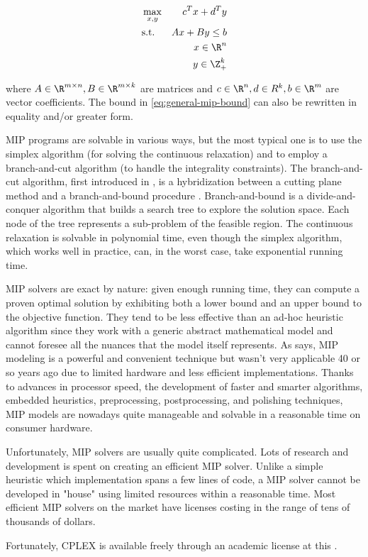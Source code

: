 \begin{align}
	 & \max_{x, y} & c^T x + d^T y                                 \\
	 & \text{s.t.} & A x + B y \le b  \label{eq:general-mip-bound} \\
	 &             & x \in \R^n                                    \\
	 &             & y \in \Z_{+}^k
\end{align}

where $A \in \R^{m \times n}, B \in \R^{m \times k}$ are matrices and
$c \in \R^n, d \in R^k, b \in \R^m$ are vector coefficients.
The bound in \cref{eq:general-mip-bound} can also be rewritten in equality and/or greater form.

MIP programs are solvable in various ways,
but the most typical one is to use the simplex algorithm
(for solving the continuous relaxation)
and to employ a branch-and-cut algorithm (to handle the integrality constraints).
The branch-and-cut algorithm,
first introduced in \textcite{padberg1991},
is a hybridization between a cutting plane method
and a branch-and-bound procedure \parencite{land2010}.
Branch-and-bound is a divide-and-conquer algorithm
that builds a search tree to explore the solution space.
Each node of the tree represents a sub-problem of the feasible region.
The continuous relaxation is solvable in polynomial time,
even though the simplex algorithm,
which works well in practice, can, in the worst case, take exponential running time.

MIP solvers are exact by nature: given enough running time, they can compute a proven optimal solution by exhibiting both a lower bound and an upper bound to the objective function.
They tend to be less effective than an ad-hoc heuristic algorithm since they work with a generic abstract mathematical model and cannot foresee all the nuances that the model itself represents.
As \textcite{bixby1999} says, MIP modeling is a powerful and convenient technique but wasn't very applicable 40 or so years ago due to limited hardware and less efficient implementations.
Thanks to advances in processor speed, the development of faster and smarter algorithms, embedded heuristics, preprocessing, postprocessing, and polishing techniques, MIP models are nowadays quite manageable and solvable in a reasonable time on consumer hardware.

Unfortunately, MIP solvers are usually quite complicated.
Lots of research and development is spent on creating an efficient MIP solver.
Unlike a simple heuristic which implementation spans a few lines of code, a MIP solver cannot be developed in "house" using limited resources within a reasonable time.
Most efficient MIP solvers on the market have licenses costing in the range of tens of thousands of dollars.

Fortunately, CPLEX is available freely through an academic license at this
.
